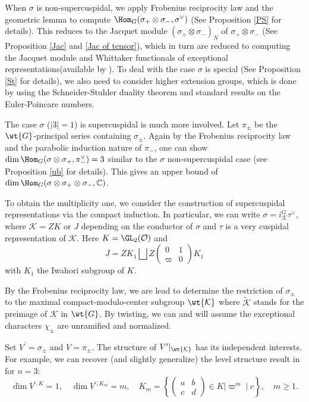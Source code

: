 \documentclass[11pt,reqno]{amsart}
\newcommand{\BC}{{\mathbb {C}}} \newcommand{\BD}{{\mathbb {D}}}
\newcommand{\CK}{{\mathcal {K}}} \newcommand{\CL}{{\mathcal {L}}}
\newcommand{\CO}{{\mathcal {O}}} \newcommand{\CP}{{\mathcal {P}}}
\theoremstyle{plain}
\theoremstyle{remark} \newtheorem{remark}[thm]{Remark}
\theoremstyle{definition} \newtheorem{exercise}[thm]{Exercise}
\theoremstyle{definition} \newtheorem{example}[thm]{Example} \newtheorem{condition}[thm]{Condition}
\numberwithin{equation}{section}
\renewcommand{\-}{\text{--}}
\begin{document}
 When $\sigma$ 
is non-supercuspidal, we apply Frobenius reciprocity law and the geometric lemma to compute $\Hom_{G}(\sigma_+\otimes\sigma_-,\sigma^\vee)$ (See Proposition \ref{PS} for details). This reduces to   the Jacquet module $(\sigma_+\otimes\sigma_{-})_N$ of $\sigma_+\otimes\sigma_{-}$ (See Proposition \ref{Jac} and \ref{Jac of tensor}), which in turn are reduced to computing the Jacquet module and Whittaker functionals of exceptional representations(available by  \cite{KP84}).  To deal with the case $\sigma$ is special (See Proposition \ref{St} for details), we also need to consider higher extension groups, which is done by using  the Schneider-Stuhler duality theorem and standard results on the Euler-Poincare numbers. 

The  case $\sigma$ ($|3|=1$) is supercuspidal  is much more involved. Let $\pi_{\pm}$ be the $\wt{G}$-principal series containing $\sigma_\pm$. Again by the Frobenius reciprocity law and the parabolic induction nature of $\pi_-$, one can show $\dim\Hom_G(\sigma\otimes\sigma_+, \pi_-^\vee)=3$ similar to the $\sigma$ non-supercuspidal case (see Proposition \ref{ub} for details). This gives an upper bound of $\dim\Hom_G(\sigma\otimes\sigma_+\otimes\sigma_-,\BC)$. 

To obtain the multiplicity one, we 
consider the construction of supercuspidal representations via the compact induction. In particular, we can write $\sigma=i_{\CK}^G\tau^\vee$, where $\CK=ZK$ or $J$ depending on the conductor of $\sigma$ and $\tau$ is a very cuspidal representation of $\CK$. Here  $K=\GL_2(\CO)$ and \[J=ZK_1\bigsqcup Z\begin{pmatrix} 0 & 1\\ \varpi & 0\end{pmatrix} K_1\]
with $K_1$ the Iwahori subgroup of $K$.


By the Frobenius reciprocity law, we are lead to determine the restriction of $\sigma_{\pm}$ to the maximal compact-modulo-center subgroup $\wt{\CK}$ where $\tilde{\CK}$ stands for the preimage of $\CK$ in $\wt{G}$. By twisting, we can and will assume the exceptional characters $\chi_{\pm}$ are unramified and normalized.


Set  $V^\prime=\sigma_{\pm}$ and $V = \pi_{\pm}$. The structure of $V^\prime|_{\wt{\CK}}$ has  its independent interests. For example, we can recover  (and slightly generalize) the level structure result  in \cite{Pat98} for $n=3$:
\[\dim V^{\prime,K}=1,\quad \dim V^{\prime,K_m}=m, \quad K_m=\left\{\begin{pmatrix} a & b\\ c & d\end{pmatrix}\in K \Bigg| \varpi^m \mid c \right\}, \quad m\geq 1.\]
 
\end{document}

